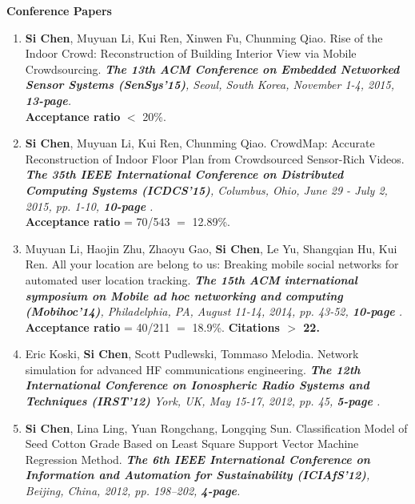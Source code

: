 \documentclass[letter]{article}
\newcommand{\publication}[4]{\item #1. #2. \emph{#3.} #4}
\begin{document}
\begin{description}





\textbf{Conference Papers}

\begin{enumerate}[{C-}1.]

\publication{\textbf{Si Chen}, Muyuan Li, Kui Ren, Xinwen Fu, Chunming Qiao} {Rise of the Indoor Crowd: Reconstruction of Building Interior View via Mobile Crowdsourcing}  {\textbf{The 13th ACM Conference on Embedded Networked Sensor Systems (SenSys'15)}, Seoul, South Korea, November 1-4, 2015, \textbf{13-page}} \\
\textbf{Acceptance ratio} $<$ 20\%.

\publication{\textbf{Si Chen}, Muyuan Li, Kui Ren, Chunming Qiao} {CrowdMap: Accurate Reconstruction of Indoor Floor Plan from Crowdsourced Sensor-Rich Videos}  {\textbf{The 35th IEEE International Conference on Distributed Computing Systems (ICDCS'15)}, Columbus, Ohio, June 29 - July 2, 2015, pp. 1-10, \textbf{10-page }} {} \\
\textbf{Acceptance ratio} = 70/543 $=$ 12.89\%.

\publication{Muyuan Li, Haojin Zhu, Zhaoyu Gao, \textbf{Si Chen}, Le Yu, Shangqian Hu, Kui Ren} {All your location are belong to us: Breaking mobile social networks for automated user location tracking}  {\textbf{The 15th ACM international symposium on Mobile ad hoc networking and computing (Mobihoc'14)}, Philadelphia, PA, August 11-14, 2014, pp. 43-52, \textbf{10-page }} \\
\textbf{Acceptance ratio} = 40/211 $=$ 18.9\%. \textbf{Citations $>$ 22.}

\publication{Eric Koski, \textbf{Si Chen}, Scott Pudlewski, Tommaso Melodia} {Network simulation for advanced HF communications engineering}  {\textbf{The 12th International Conference on Ionospheric Radio Systems and Techniques (IRST'12)} York, UK, May 15-17, 2012, pp. 45, \textbf{5-page }}

\publication{\textbf{Si Chen}, Lina Ling, Yuan Rongchang, Longqing Sun} {Classification Model of Seed Cotton Grade Based on Least Square Support Vector Machine Regression Method}  {\textbf{The 6th IEEE International Conference on Information and Automation for Sustainability (ICIAfS'12)}, Beijing, China, 2012, pp. 198--202, \textbf{4-page}} 


\end{enumerate}
\end{description}
\end{document}
